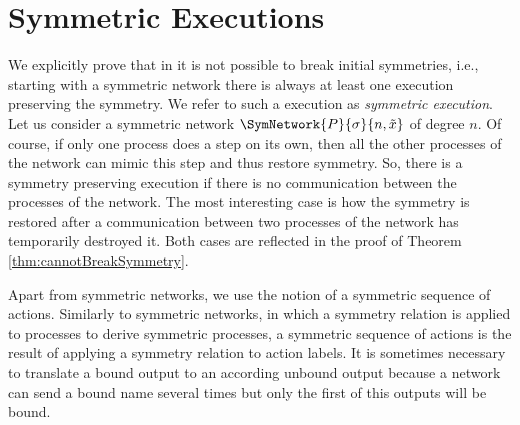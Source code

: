 \documentclass[11pt,techReport]{eptcs}
\begin{document}
\section{Symmetric Executions} \label{sec:breakingSymmetry}

We explicitly prove that in \pisep it is not possible to break initial symmetries, i.e., starting with a symmetric network there is always at least one execution preserving the symmetry. We  refer to such a execution as \emph{symmetric execution}. Let us consider a symmetric network $ \SymNetwork{P}{\sigma}{n, \tilde{x}} $ of degree $ n $. Of course, if only one process does a step on its own, then all the other processes of the network can mimic this step and thus restore symmetry. So, there is a symmetry preserving execution if there is no communication between the processes of the network. The most interesting case is how the symmetry is restored after a communication between two processes of the network has temporarily destroyed it. Both cases are reflected in the proof of Theorem \ref{thm:cannotBreakSymmetry}.

Apart from symmetric networks, we use the notion of a symmetric sequence of actions. Similarly to symmetric networks, in which a symmetry relation is applied to processes to derive symmetric processes, a symmetric sequence of actions is the result of applying a symmetry relation to action labels. It is sometimes necessary to translate a bound output to an according unbound output because a network can send a bound name several times but only the first of this outputs will be bound.

\end{document}
